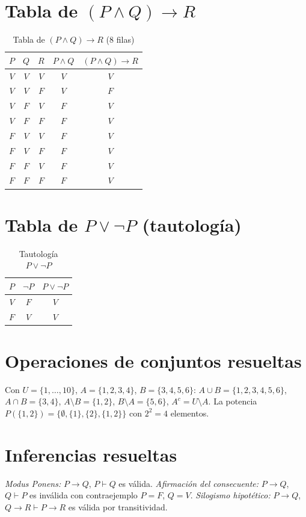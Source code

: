 \documentclass[11pt,a4paper,openany]{book}
\begin{document}
\section{Tabla de $(P \land Q) \to R$}
\begin{table}[H]
\centering
\caption{Tabla de $(P \land Q) \to R$ (8 filas)}
\begin{tabular}{ccc|c|c}
\toprule
$P$ & $Q$ & $R$ & $P \land Q$ & $(P \land Q) \to R$ \\
\midrule
$V$ & $V$ & $V$ & $V$ & $V$ \\
$V$ & $V$ & $F$ & $V$ & $F$ \\
$V$ & $F$ & $V$ & $F$ & $V$ \\
$V$ & $F$ & $F$ & $F$ & $V$ \\
$F$ & $V$ & $V$ & $F$ & $V$ \\
$F$ & $V$ & $F$ & $F$ & $V$ \\
$F$ & $F$ & $V$ & $F$ & $V$ \\
$F$ & $F$ & $F$ & $F$ & $V$ \\
\bottomrule
\end{tabular}
\end{table}

\section{Tabla de $P \lor \lnot P$ (tautolog\'ia)}
\begin{table}[H]
\centering
\caption{Tautolog\'ia $P \lor \lnot P$}
\begin{tabular}{cc|c}
\toprule
$P$ & $\lnot P$ & $P \lor \lnot P$ \\
\midrule
$V$ & $F$ & $V$ \\
$F$ & $V$ & $V$ \\
\bottomrule
\end{tabular}
\end{table}

\section{Operaciones de conjuntos resueltas}
Con $U = \{1,\ldots,10\}$, $A = \{1,2,3,4\}$, $B = \{3,4,5,6\}$: $A \cup B = \{1,2,3,4,5,6\}$, $A \cap B = \{3,4\}$, $A \setminus B = \{1,2\}$, $B \setminus A = \{5,6\}$, $A^{c} = U \setminus A$. La potencia $P(\{1,2\}) = \{\emptyset, \{1\}, \{2\}, \{1,2\}\}$ con $2^{2} = 4$ elementos.

\section{Inferencias resueltas}
\textit{Modus Ponens:} $P \to Q$, $P \vdash Q$ es v\'alida. \textit{Afirmaci\'on del consecuente:} $P \to Q$, $Q \vdash P$ es inv\'alida con contraejemplo $P = F$, $Q = V$. \textit{Silogismo hipot\'etico:} $P \to Q$, $Q \to R \vdash P \to R$ es v\'alida por transitividad.
\end{document}
